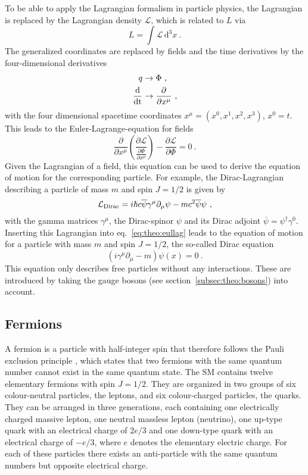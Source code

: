 \noindent To be able to apply the Lagrangian formalism in particle physics, the Lagrangian is replaced by the Lagrangian density $\mathcal{L}$, which is related to $L$ via
\begin{equation}
L=\int \! \mathcal{L} \, \mathrm{d}^3x ~.
\end{equation}
The generalized coordinates are replaced by fields and the time derivatives by the four-dimensional derivatives
\begin{align*}
q &\rightarrow \Phi ~, \\
\frac{\rm{d}}{\rm{dt}} &\rightarrow \frac{\partial}{\partial x^\mu} ~,
\end{align*}
with the four dimensional spacetime coordinates $x^\mu = (x^0,x^1,x^2,x^3)$, $x^0=t$. This leads to the Euler-Lagrange-equation for fields
\begin{equation}
\frac{\partial}{\partial x^\mu} \left( \frac{\partial \mathcal{L}}{\frac{\partial \Phi}{\partial x^\mu}} \right) - \frac{\partial \mathcal{L}}{\partial \Phi} = 0 ~. \label{eq:theo:eullag}
\end{equation}
Given the Lagrangian of a field, this equation can be used to derive the equation of motion for the corresponding particle. For example, the Dirac-Lagrangian describing a particle of mass $m$ and spin $J=1/2$ is given by
\begin{equation}
\mathcal{L}_{\rm Dirac}=i\hbar c \overline{\psi} \gamma^\mu \partial_\mu \psi -  mc^2\overline{\psi}\psi ~, \label{eq:theo:diraclag}
\end{equation}
with the gamma matrices $\gamma^\mu$, the Dirac-spinor $\psi$ and its Dirac adjoint $\overline{\psi}=\psi^\dagger \gamma^0$. Inserting this Lagrangian into eq.~\ref{eq:theo:eullag} leads to the equation of motion for a particle with mass $m$ and spin $J=1/2$, the so-called Dirac equation
\begin{equation}
\left(i\gamma^\mu\partial_\mu-m\right)\psi(x)=0 ~.
\end{equation}
This equation only describes free particles without any interactions. These are introduced by taking the gauge bosons (see section~\ref{subsec:theo:bosons}) into account.

\subsection{Fermions}
\label{subsec:fermions}
A fermion is a particle with half-integer spin that therefore follows the Pauli exclusion principle \cite{pauli}, which states that two fermions with the same quantum number cannot exist in the same quantum state. The SM contains twelve elementary fermions with spin $J=1/2$. They are organized in two groups of six colour-neutral particles, the leptons, and six colour-charged particles, the quarks. They can be arranged in three generations, each containing one electrically charged massive lepton, one neutral massless lepton (neutrino), one up-type quark with an electrical charge of $2e/3$ and one down-type quark with an electrical charge of $-e/3$, where $e$ denotes the elementary electric charge. For each of these particles there exists an anti-particle with the same quantum numbers but opposite electrical charge.\\
 
